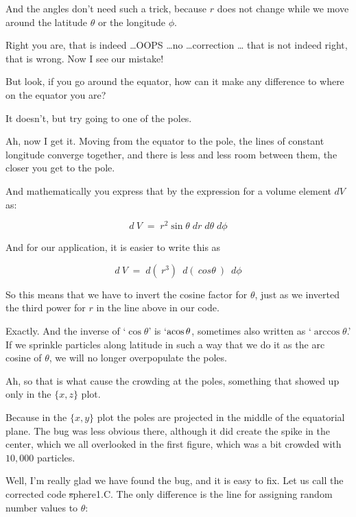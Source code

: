 \bob
And the angles don't need such a trick, because $r$ does not change
while we move around the latitude $\theta$ or the longitude $\phi$.

\alice
Right you are, that is indeed \dots OOPS \dots no \dots correction \dots
that is not indeed right, that is wrong.  Now I see our mistake!

\carol
But look, if you go around the equator, how can it make any difference
to where on the equator you are?

\alice
It doesn't, but try going to one of the poles.

\carol
Ah, now I get it.  Moving from the equator to the pole, the lines of
constant longitude converge together, and there is less and less room
between them, the closer you get to the pole.

\alice
And mathematically you express that by the expression for a volume
element $dV$ as:

\cba

\begin{equation}
d\:V \; = \; r^2 \sin \theta \; dr \; d\theta \; d\phi
\end{equation}

\abc
\alice
And for our application, it is easier to write this as
\cba

\begin{equation}
d\:V \; = \; d(\: r^3)\: \; d(\: cos \theta \:)\: \; d\phi
\end{equation}

\abc

\bob
So this means that we have to invert the cosine factor for $\theta$,
just as we inverted the third power for $r$ in the line above in our
code.

\alice
Exactly.  And the inverse of `$\cos \theta$' is `$\rm{acos}\, \theta$,
sometimes also written as `$\arccos \theta$.'  If we
sprinkle particles along latitude in such a way that we do it as the
arc cosine of $\theta$, we will no longer overpopulate the poles.

\carol
Ah, so that is what cause the crowding at the poles, something that
showed up only in the $\{x,z\}$ plot.

\bob
Because in the $\{x,y\}$ plot the poles are projected in the middle of
the equatorial plane.  The bug was less obvious there, although it did
create the spike in the center, which we all overlooked in the first
figure, which was a bit crowded with $10,000$ particles.

\alice
Well, I'm really glad we have found the bug, and it is easy to fix.
Let us call the corrected code {\st sphere1.C}.  The only difference
is the line for assigning random number values to $\theta$:

